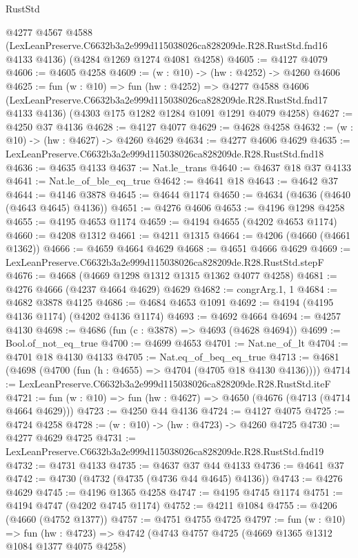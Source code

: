 \begin{lexlean}{RustStd}
\begin{coremodule}
  @4277
    @4567
    @4588
    (LexLeanPreserve.C6632b3a2e999d115038026ca828209de.R28.RustStd.fnd16 @4133 @4136)
    (@4284 @1269 @1274 @4081 @4258)
@4605 := @4127 @4079
@4606 := @4605 @4258
@4609 := (w : @10) -> (hw : @4252) -> @4260 @4606
@4625 := fun (w : @10) =>
  fun (hw : @4252) =>
  @4277
    @4588
    @4606
    (LexLeanPreserve.C6632b3a2e999d115038026ca828209de.R28.RustStd.fnd17 @4133 @4136)
    (@4303 @175 @1282 @1284 @1091 @1291 @4079 @4258)
@4627 := @4250 @37 @4136
@4628 := @4127 @4077
@4629 := @4628 @4258
@4632 := (w : @10) -> (hw : @4627) -> @4260 @4629
@4634 := @4277 @4606 @4629
@4635 := LexLeanPreserve.C6632b3a2e999d115038026ca828209de.R28.RustStd.fnd18
@4636 := @4635 @4133
@4637 := Nat.le_trans
@4640 := @4637 @18 @37 @4133
@4641 := Nat.le_of_ble_eq_true
@4642 := @4641 @18
@4643 := @4642 @37
@4644 := @4146 @3878
@4645 := @4644 @1174
@4650 := @4634 (@4636 (@4640 (@4643 @4645) @4136))
@4651 := @4276 @4606
@4653 := @4196 @1298 @4258
@4655 := @4195 @4653 @1174
@4659 := @4194 @4655 (@4202 @4653 @1174)
@4660 := @4208 @1312
@4661 := @4211 @1315
@4664 := @4206 (@4660 (@4661 @1362))
@4666 := @4659 @4664 @4629
@4668 := @4651 @4666 @4629
@4669 := LexLeanPreserve.C6632b3a2e999d115038026ca828209de.R28.RustStd.stepF
@4676 := @4668 (@4669 @1298 @1312 @1315 @1362 @4077 @4258)
@4681 := @4276 @4666 (@4237 @4664 @4629) @4629
@4682 := congrArg.{1, 1}
@4684 := @4682 @3878 @4125
@4686 := @4684 @4653 @1091
@4692 := @4194 (@4195 @4136 @1174) (@4202 @4136 @1174)
@4693 := @4692 @4664
@4694 := @4257 @4130
@4698 := @4686 (fun (c : @3878) => @4693 (@4628 @4694))
@4699 := Bool.of_not_eq_true
@4700 := @4699 @4653
@4701 := Nat.ne_of_lt
@4704 := @4701 @18 @4130 @4133
@4705 := Nat.eq_of_beq_eq_true
@4713 := @4681 (@4698 (@4700 (fun (h : @4655) => @4704 (@4705 @18 @4130 @4136))))
@4714 := LexLeanPreserve.C6632b3a2e999d115038026ca828209de.R28.RustStd.iteF
@4721 := fun (w : @10) => fun (hw : @4627) => @4650 (@4676 (@4713 (@4714 @4664 @4629)))
@4723 := @4250 @44 @4136
@4724 := @4127 @4075
@4725 := @4724 @4258
@4728 := (w : @10) -> (hw : @4723) -> @4260 @4725
@4730 := @4277 @4629 @4725
@4731 := LexLeanPreserve.C6632b3a2e999d115038026ca828209de.R28.RustStd.fnd19
@4732 := @4731 @4133
@4735 := @4637 @37 @44 @4133
@4736 := @4641 @37
@4742 := @4730 (@4732 (@4735 (@4736 @44 @4645) @4136))
@4743 := @4276 @4629
@4745 := @4196 @1365 @4258
@4747 := @4195 @4745 @1174
@4751 := @4194 @4747 (@4202 @4745 @1174)
@4752 := @4211 @1084
@4755 := @4206 (@4660 (@4752 @1377))
@4757 := @4751 @4755 @4725
@4797 := fun (w : @10) =>
  fun (hw : @4723) =>
  @4742
    (@4743
      @4757
      @4725
      (@4669 @1365 @1312 @1084 @1377 @4075 @4258)

\end{coremodule}
\end{lexlean}
